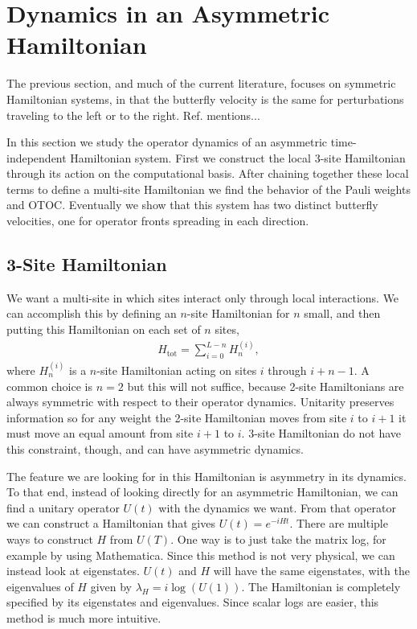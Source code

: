 \section{Dynamics in an Asymmetric Hamiltonian} \label{sec:asymham}

The previous section, and much of the current literature, focuses on symmetric Hamiltonian systems, in that the butterfly velocity is the same for perturbations traveling to the left or to the right. Ref.\cite{??} mentions...

In this section we study the operator dynamics of an asymmetric time-independent Hamiltonian system. First we construct the local 3-site Hamiltonian through its action on the computational basis. 
After chaining together these local terms to define a multi-site Hamiltonian we find the behavior of the Pauli weights and OTOC. Eventually we show that this system has two distinct butterfly velocities, one for operator fronts spreading in each direction.

\subsection{3-Site Hamiltonian}  \label{sub:hamiltonian}

We want a multi-site in which sites interact only through local interactions. We can accomplish this by defining an $n$-site Hamiltonian for $n$ small, and then putting this Hamiltonian on each set of $n$ sites,
\begin{align}
H_{\text{tot}} = \sum_{i=0}^{L-n}H_n^{(i)},
 \label{eqn:chain}
\end{align}
where $H_n^{(i)}$ is a $n$-site Hamiltonian acting on sites $i$ through $i+n-1$.
A common choice is $n=2$ but this will not suffice, because 2-site Hamiltonians are always symmetric with respect to their operator dynamics. Unitarity preserves information so for any weight the 2-site Hamiltonian moves from site $i$ to $i+1$ it must move an equal amount from site $i+1$ to $i$. 3-site Hamiltonian do not have this constraint, though, and can have asymmetric dynamics.

The feature we are looking for in this Hamiltonian is asymmetry in its dynamics. To that end, instead of looking directly for an asymmetric Hamiltonian, we can find a unitary operator $U(t)$ with the dynamics we want. From that operator we can construct a Hamiltonian that gives $U(t)=e^{-iHt}$. There are multiple ways to construct $H$ from $U(T)$. One way is to just take the matrix log, for example by using Mathematica. Since this method is not very physical, we can instead look at eigenstates. $U(t)$ and $H$ will have the same eigenstates, with the eigenvalues of $H$ given by $\lambda_H = i\log(U(1))$. The Hamiltonian is completely specified by its eigenstates and eigenvalues. Since scalar logs are easier, this method is much more intuitive.

